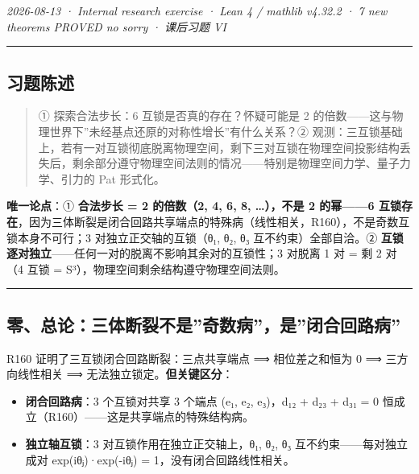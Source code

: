 \documentclass[
]{article}
\providecommand{\tightlist}{%
 \setlength{\itemsep}{0pt}\setlength{\parskip}{0pt}}
\begin{document}
\emph{2026-08-13 · Internal research exercise · Lean 4 / mathlib v4.32.2
· 7 new theorems PROVED no sorry · 课后习题 VI }

\begin{center}\rule{0.5\linewidth}{0.5pt}\end{center}

\subsection{习题陈述}\label{ux4e60ux9898ux9648ux8ff0}

\begin{quote}
① 探索合法步长：6 互锁是否真的存在？怀疑可能是 2
的倍数------这与物理世界下''未经基点还原的对称性增长''有什么关系？②
观测：三互锁基础上，若有一对互锁彻底脱离物理空间，剩下三对互锁在物理空间投影结构丢失后，剩余部分遵守物理空间法则的情况------特别是物理空间力学、量子力学、引力的
Pat 形式化。
\end{quote}

\textbf{唯一论点}：① \textbf{合法步长 = 2 的倍数（2, 4, 6, 8,
\ldots），不是 2 的幂------6
互锁存在}，因为三体断裂是闭合回路共享端点的特殊病（线性相关，R160），不是奇数互锁本身不可行；3
对独立正交轴的互锁（θ₁, θ₂, θ₃ 互不约束）全部自洽。②
\textbf{互锁逐对独立}------任何一对的脱离不影响其余对的互锁性；3 对脱离
1 对 = 剩 2 对（4 互锁 = S³），物理空间剩余结构遵守物理空间法则。

\begin{center}\rule{0.5\linewidth}{0.5pt}\end{center}

\subsection{零、总论：三体断裂不是''奇数病''，是''闭合回路病''}\label{ux96f6ux603bux8bbaux4e09ux4f53ux65adux88c2ux4e0dux662fux5947ux6570ux75c5ux662fux95edux5408ux56deux8defux75c5}

R160 证明了三互锁闭合回路断裂：三点共享端点 ⟹ 相位差之和恒为 0 ⟹
三方向线性相关 ⟹ 无法独立锁定。\textbf{但关键区分}：

\begin{itemize}
\tightlist
\item
 \textbf{闭合回路病}：3 个互锁对共享 3 个端点 (e₁, e₂, e₃)，d₁₂ + d₂₃ +
 d₃₁ = 0 恒成立（R160）------这是共享端点的特殊结构病。
\item
 \textbf{独立轴互锁}：3 对互锁作用在独立正交轴上，θ₁, θ₂, θ₃
 互不约束------每对独立成对 exp(iθⱼ)·exp(-iθⱼ) =
 1，没有闭合回路线性相关。
\end{itemize}
\end{document}
